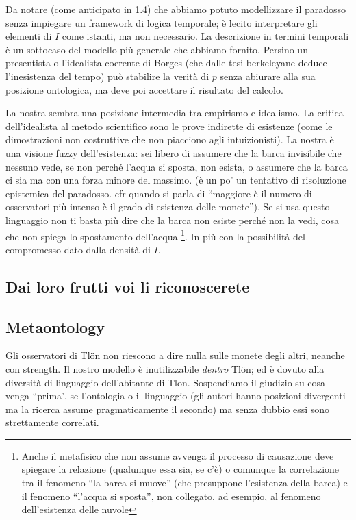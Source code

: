 Da notare (come anticipato in 1.4) che abbiamo potuto modellizzare il paradosso senza impiegare un framework di logica temporale; è lecito interpretare gli elementi di $I$ come istanti, ma non necessario. La descrizione in termini temporali è un sottocaso del modello più generale che abbiamo fornito. Persino un presentista o l'idealista coerente di Borges (che dalle tesi berkeleyane deduce l'inesistenza del tempo) può stabilire la verità di $p$ senza abiurare alla sua posizione ontologica, ma deve poi accettare il risultato del calcolo. 


La nostra sembra una posizione intermedia tra empirismo e idealismo. La critica dell'idealista al metodo scientifico sono le prove indirette di esistenze (come le dimostrazioni non costruttive che non piacciono agli intuizionisti). La nostra è una visione fuzzy dell'esistenza: sei libero di assumere che la barca invisibile che nessuno vede, se non perché l'acqua si sposta, non esista, o assumere che la barca ci sia ma con una forza minore del massimo. (è un po' un tentativo di risoluzione epistemica del paradosso. cfr quando si parla di ``maggiore è il numero di osservatori più intenso è il grado di esistenza delle monete''). Se si usa questo linguaggio non ti basta più dire che la barca non esiste perché non la vedi, cosa che non spiega lo spostamento dell'acqua \footnote{Anche il metafisico che non assume avvenga il processo di causazione deve spiegare la relazione (qualunque essa sia, se c'è) o comunque la correlazione tra il fenomeno ``la barca si muove'' (che presuppone l'esistenza della barca) e il fenomeno ``l'acqua si sposta'', non collegato, ad esempio, al fenomeno dell'esistenza delle nuvole}. In più con la possibilità del compromesso dato dalla densità di $I$.
\subsection{Dai loro frutti voi li riconoscerete}\label{frutti}


\subsection{Metaontology} \label{metaon} 
Gli osservatori di Tl\"on non riescono a dire nulla sulle monete degli altri, neanche con strength. Il nostro modello è inutilizzabile \emph{dentro} Tl\"on; ed è dovuto alla diversità di linguaggio dell'abitante di Tlon. Sospendiamo il giudizio su cosa venga ``prima', se l'ontologia o il linguaggio (gli autori hanno posizioni divergenti ma la ricerca assume pragmaticamente il secondo) ma senza dubbio essi sono strettamente correlati.

